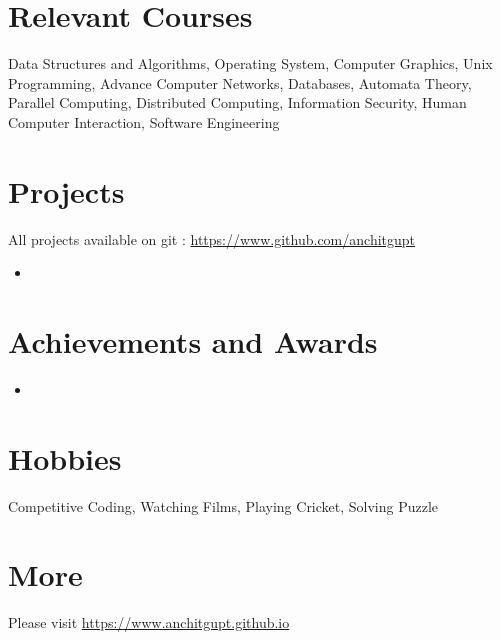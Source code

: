 \documentclass[margin, centered]{res}
\begin{document}
\begin{resume}
\section{Relevant \hspace{2mm} Courses}
Data Structures and Algorithms, Operating System, Computer Graphics, Unix Programming, Advance Computer Networks, Databases, Automata Theory, Parallel Computing, Distributed Computing, Information Security, Human Computer Interaction, Software Engineering


\section{Projects}
All projects available on git : \url{https://www.github.com/anchitgupt}
\begin{itemize}[leftmargin=*]
 \item 
\end{itemize}




\section{Achievements and Awards}
\begin{itemize}[leftmargin=*]
 \item
\end{itemize}


\section{Hobbies}
Competitive Coding, Watching Films, Playing Cricket, Solving Puzzle

\section{More}
Please visit \href{https://www.anchitgupt.github.io}{https://www.anchitgupt.github.io}

\end{resume}
\end{document}
